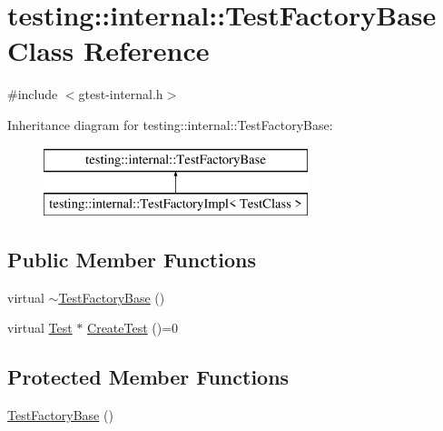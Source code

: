 \hypertarget{classtesting_1_1internal_1_1_test_factory_base}{\section{testing\+:\+:internal\+:\+:Test\+Factory\+Base Class Reference}
\label{classtesting_1_1internal_1_1_test_factory_base}
}


{\ttfamily \#include $<$gtest-\/internal.\+h$>$}

Inheritance diagram for testing\+:\+:internal\+:\+:Test\+Factory\+Base\+:\begin{figure}[H]
\begin{center}
\leavevmode
\includegraphics[height=2.000000cm]{classtesting_1_1internal_1_1_test_factory_base}
\end{center}
\end{figure}
\subsection*{Public Member Functions}
\begin{DoxyCompactItemize}
\item 
virtual \hyperlink{classtesting_1_1internal_1_1_test_factory_base_a18f22a7594336a36642289c1decddc9e}{$\sim$\+Test\+Factory\+Base} ()
\item 
virtual \hyperlink{classtesting_1_1_test}{Test} $\ast$ \hyperlink{classtesting_1_1internal_1_1_test_factory_base_a07ac3ca0b196cdb092da0bb186b7c030}{Create\+Test} ()=0
\end{DoxyCompactItemize}
\subsection*{Protected Member Functions}
\begin{DoxyCompactItemize}
\item 
\hyperlink{classtesting_1_1internal_1_1_test_factory_base_afedbf147b2a213517b315880d8c81427}{Test\+Factory\+Base} ()
\end{DoxyCompactItemize}


